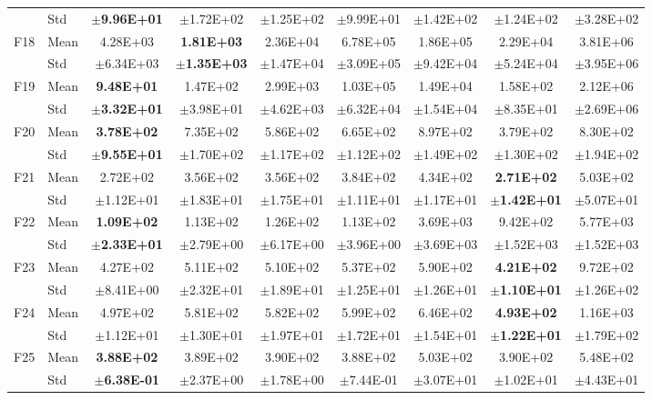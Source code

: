 \begin{table}[htbp]
{\begin{tabular}{clccccccc}
 & Std & $\pm$\textbf{9.96E+01} & $\pm$1.72E+02 & $\pm$1.25E+02 & $\pm$9.99E+01 & $\pm$1.42E+02 & $\pm$1.24E+02 & $\pm$3.28E+02 \\
F18 & Mean & 4.28E+03 & \textbf{1.81E+03} & 2.36E+04 & 6.78E+05 & 1.86E+05 & 2.29E+04 & 3.81E+06 \\
 & Std & $\pm$6.34E+03 & $\pm$\textbf{1.35E+03} & $\pm$1.47E+04 & $\pm$3.09E+05 & $\pm$9.42E+04 & $\pm$5.24E+04 & $\pm$3.95E+06 \\
F19 & Mean & \textbf{9.48E+01} & 1.47E+02 & 2.99E+03 & 1.03E+05 & 1.49E+04 & 1.58E+02 & 2.12E+06 \\
 & Std & $\pm$\textbf{3.32E+01} & $\pm$3.98E+01 & $\pm$4.62E+03 & $\pm$6.32E+04 & $\pm$1.54E+04 & $\pm$8.35E+01 & $\pm$2.69E+06 \\
F20 & Mean & \textbf{3.78E+02} & 7.35E+02 & 5.86E+02 & 6.65E+02 & 8.97E+02 & 3.79E+02 & 8.30E+02 \\
 & Std & $\pm$\textbf{9.55E+01} & $\pm$1.70E+02 & $\pm$1.17E+02 & $\pm$1.12E+02 & $\pm$1.49E+02 & $\pm$1.30E+02 & $\pm$1.94E+02 \\
F21 & Mean & 2.72E+02 & 3.56E+02 & 3.56E+02 & 3.84E+02 & 4.34E+02 & \textbf{2.71E+02} & 5.03E+02 \\
 & Std & $\pm$1.12E+01 & $\pm$1.83E+01 & $\pm$1.75E+01 & $\pm$1.11E+01 & $\pm$1.17E+01 & $\pm$\textbf{1.42E+01} & $\pm$5.07E+01 \\
F22 & Mean & \textbf{1.09E+02} & 1.13E+02 & 1.26E+02 & 1.13E+02 & 3.69E+03 & 9.42E+02 & 5.77E+03 \\
 & Std & $\pm$\textbf{2.33E+01} & $\pm$2.79E+00 & $\pm$6.17E+00 & $\pm$3.96E+00 & $\pm$3.69E+03 & $\pm$1.52E+03 & $\pm$1.52E+03 \\
F23 & Mean & 4.27E+02 & 5.11E+02 & 5.10E+02 & 5.37E+02 & 5.90E+02 & \textbf{4.21E+02} & 9.72E+02 \\
 & Std & $\pm$8.41E+00 & $\pm$2.32E+01 & $\pm$1.89E+01 & $\pm$1.25E+01 & $\pm$1.26E+01 & $\pm$\textbf{1.10E+01} & $\pm$1.26E+02 \\
F24 & Mean & 4.97E+02 & 5.81E+02 & 5.82E+02 & 5.99E+02 & 6.46E+02 & \textbf{4.93E+02} & 1.16E+03 \\
 & Std & $\pm$1.12E+01 & $\pm$1.30E+01 & $\pm$1.97E+01 & $\pm$1.72E+01 & $\pm$1.54E+01 & $\pm$\textbf{1.22E+01} & $\pm$1.79E+02 \\
F25 & Mean & \textbf{3.88E+02} & 3.89E+02 & 3.90E+02 & 3.88E+02 & 5.03E+02 & 3.90E+02 & 5.48E+02 \\
 & Std & $\pm$\textbf{6.38E-01} & $\pm$2.37E+00 & $\pm$1.78E+00 & $\pm$7.44E-01 & $\pm$3.07E+01 & $\pm$1.02E+01 & $\pm$4.43E+01 \\

\end{tabular}}
\end{table}
